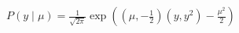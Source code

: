 \documentclass[preview]{standalone}
\begin{document}
\begin{align*}
P(y \mid \mu)= \frac{1}{\sqrt{2 \pi}}   \exp ( (\mu,-\frac{1}{2}) (y,y^2) - \frac{\mu^2}{2} )
\end{align*}
\end{document}

